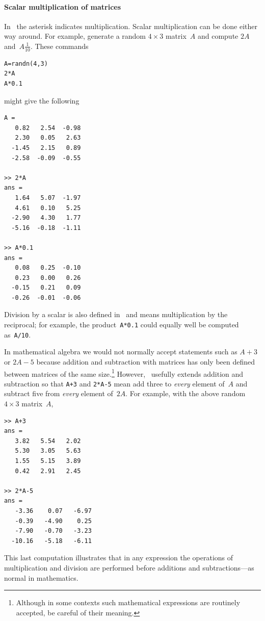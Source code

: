 \paragraph{Scalar multiplication of matrices}
In \script\ the asterisk indicates multiplication.
Scalar multiplication can be done either way around.
For example, generate a random \(4\times 3\) matrix~\(A\) and compute \(2A\) and~\(A\frac1{10}\).
These commands 
\begin{verbatim}
A=randn(4,3)
2*A
A*0.1
\end{verbatim}
\setbox\ajrqrbox\hbox{}%
\marginajrbox%
might give the following \twodp
\begin{verbatim}
A =
   0.82   2.54  -0.98
   2.30   0.05   2.63
  -1.45   2.15   0.89
  -2.58  -0.09  -0.55

>> 2*A
ans =
   1.64   5.07  -1.97
   4.61   0.10   5.25
  -2.90   4.30   1.77
  -5.16  -0.18  -1.11

>> A*0.1
ans =
   0.08   0.25  -0.10
   0.23   0.00   0.26
  -0.15   0.21   0.09
  -0.26  -0.01  -0.06
\end{verbatim}
Division by a scalar is also defined in \script\ and means multiplication by the reciprocal; for example, the product~\verb|A*0.1| could equally well be computed as~\verb|A/10|.

In mathematical algebra we would not normally accept statements such as \(A+3\) or \(2A-5\) because addition and subtraction with matrices has only been defined between matrices of the same size.\footnote{Although in some contexts such mathematical expressions are routinely accepted, be careful of their meaning.}
However, \script\ usefully extends addition and subtraction so that \verb|A+3| and \verb|2*A-5| mean add three to \emph{every} element of~\(A\) and subtract five from \emph{every} element of~\(2A\). 
For example, with the above random \(4\times3\) matrix~\(A\),
\begin{verbatim}
>> A+3
ans =
   3.82   5.54   2.02
   5.30   3.05   5.63
   1.55   5.15   3.89
   0.42   2.91   2.45

>> 2*A-5
ans =
   -3.36    0.07   -6.97
   -0.39   -4.90    0.25
   -7.90   -0.70   -3.23
  -10.16   -5.18   -6.11
\end{verbatim}
This last computation illustrates that in any expression the operations of multiplication and division are performed before additions and subtractions---as normal in mathematics.


